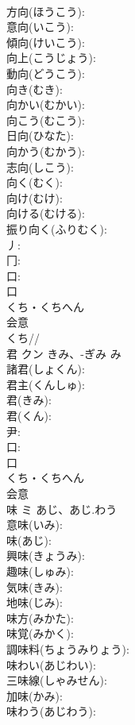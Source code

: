 \documentclass[8pt]{extreport}
\begin{document}
\begin{CJK}{UTF8}{min}
\\	方向(ほうこう): 
\\	意向(いこう): 
\\	傾向(けいこう): 
\\	向上(こうじょう): 
\\	動向(どうこう): 
\\	向き(むき): 
\\	向かい(むかい): 
\\	向こう(むこう): 
\\	日向(ひなた): 
\\	向かう(むかう): 
\\	志向(しこう): 
\\	向く(むく): 
\\	向け(むけ): 
\\	向ける(むける): 
\\	振り向く(ふりむく): 
\\	丿: 
\\	冂: 
\\	口: 
\\	口	
\\	くち・くちへん	
\\	会意 
\\	くち// 
\\	君	クン	きみ、-ぎみ	み	
\\	諸君(しょくん): 
\\	君主(くんしゅ): 
\\	君(きみ): 
\\	君(くん): 
\\	尹: 
\\	口: 
\\	口	
\\	くち・くちへん	
\\	会意 
\\	味	ミ	あじ、あじ.わう		
\\	意味(いみ): 
\\	味(あじ): 
\\	興味(きょうみ): 
\\	趣味(しゅみ): 
\\	気味(きみ): 
\\	地味(じみ): 
\\	味方(みかた): 
\\	味覚(みかく): 
\\	調味料(ちょうみりょう): 
\\	味わい(あじわい): 
\\	三味線(しゃみせん): 
\\	加味(かみ): 
\\	味わう(あじわう): 

\end{CJK}
\end{document}
